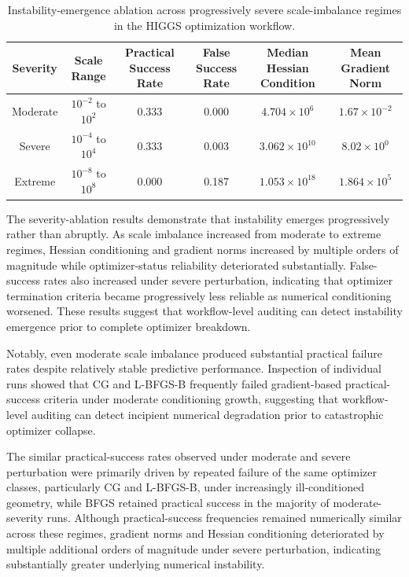 \begin{table}[htbp]
\centering
\small
\begin{tabular}{cccccc}
\toprule
\textbf{Severity} &
\textbf{Scale Range} &
\textbf{Practical Success Rate} &
\textbf{False Success Rate} &
\textbf{Median Hessian Condition} &
\textbf{Mean Gradient Norm} \\
\midrule

Moderate &
$10^{-2}$ to $10^{2}$ &
0.333 &
0.000 &
$4.704\times10^{6}$ &
$1.67\times10^{-2}$ \\

Severe &
$10^{-4}$ to $10^{4}$ &
0.333 &
0.003 &
$3.062\times10^{10}$ &
$8.02\times10^{0}$ \\

Extreme &
$10^{-8}$ to $10^{8}$ &
0.000 &
0.187 &
$1.053\times10^{18}$ &
$1.864\times10^{5}$ \\

\bottomrule
\end{tabular}
\caption{Instability-emergence ablation across progressively severe scale-imbalance regimes in the HIGGS optimization workflow.}
\label{tab:higgs_severity_ablation}
\end{table}

The severity-ablation results demonstrate that instability emerges progressively rather than abruptly. As scale imbalance increased from moderate to extreme regimes, Hessian conditioning and gradient norms increased by multiple orders of magnitude while optimizer-status reliability deteriorated substantially. False-success rates also increased under severe perturbation, indicating that optimizer termination criteria became progressively less reliable as numerical conditioning worsened. These results suggest that workflow-level auditing can detect instability emergence prior to complete optimizer breakdown.

Notably, even moderate scale imbalance produced substantial practical failure rates despite relatively stable predictive performance. Inspection of individual runs showed that CG and L-BFGS-B frequently failed gradient-based practical-success criteria under moderate conditioning growth, suggesting that workflow-level auditing can detect incipient numerical degradation prior to catastrophic optimizer collapse.

The similar practical-success rates observed under moderate and severe perturbation were primarily driven by repeated failure of the same optimizer classes, particularly CG and L-BFGS-B, under increasingly ill-conditioned geometry, while BFGS retained practical success in the majority of moderate-severity runs. Although practical-success frequencies remained numerically similar across these regimes, gradient norms and Hessian conditioning deteriorated by multiple additional orders of magnitude under severe perturbation, indicating substantially greater underlying numerical instability.

